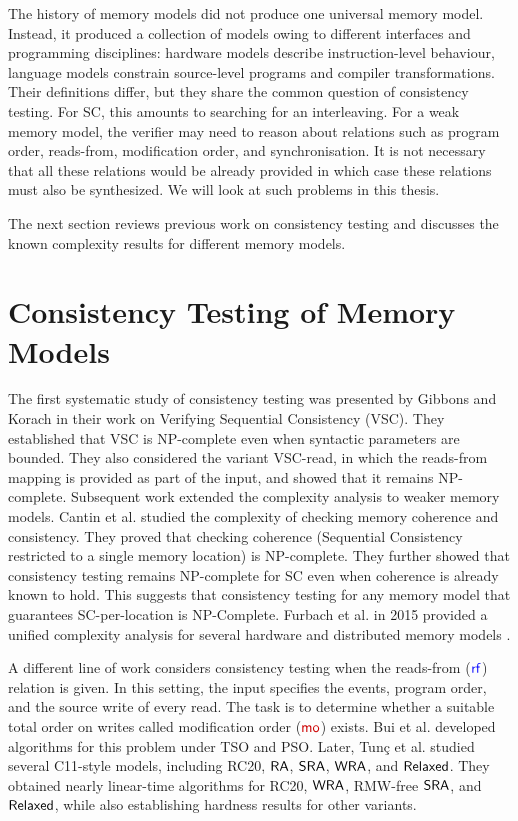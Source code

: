 The history of memory models did not produce one universal memory model. Instead, it produced a collection of models owing to different interfaces and programming disciplines: hardware models describe instruction-level behaviour, language models constrain source-level programs and compiler transformations. Their definitions differ, but they share the common question of consistency testing. For SC, this amounts to searching for an interleaving. For a weak memory model, the verifier may need to reason about relations such as program order, reads-from,  modification order, and synchronisation. It is not necessary that all these relations would be already provided in which case these relations must also be synthesized. We will look at such problems in this thesis.

The next section reviews previous work on consistency testing and discusses the known complexity results for different memory models.

\section{Consistency Testing of Memory Models}\label{intro:consistency-testing}

The first systematic study of consistency testing was presented by Gibbons and Korach \cite{Gibbons} in their work on Verifying Sequential Consistency (VSC). They established that VSC is NP-complete even when syntactic parameters are bounded.  They also considered the variant VSC-read, in which the reads-from mapping is provided as part of the input, and showed that it remains NP-complete. Subsequent work extended the complexity analysis to weaker memory models. Cantin et al. \cite{CantinLS05} studied the complexity of checking memory coherence and consistency. They proved that checking coherence (Sequential Consistency restricted to a single memory location) is NP-complete. They further showed that consistency testing remains NP-complete for SC even when coherence is already known to hold. This suggests that consistency testing for  any memory model that guarantees SC-per-location is NP-Complete. Furbach et al. in 2015 provided a unified complexity analysis for several hardware and distributed memory models \cite{Unified_Furbach}.

A different line of work considers consistency testing when the reads-from ($\rf$) relation is given. In this setting, the input specifies the events, program order, and the source write of every read. The task is to determine whether a suitable total  order on writes called modification order ($\mo$) exists. Bui et al. \cite{tso_rf_bui2021reads} developed algorithms for this problem under TSO and PSO. Later, Tun\c{c} et al. \cite{Tunc2023} studied several C11-style models, including RC20, $\mathsf{RA}$, $\mathsf{SRA}$, $\mathsf{WRA}$, and $\mathsf{Relaxed}$. They obtained nearly linear-time algorithms for RC20, $\mathsf{WRA}$, RMW-free $\mathsf{SRA}$, and $\mathsf{Relaxed}$, while also establishing hardness results for other variants.

